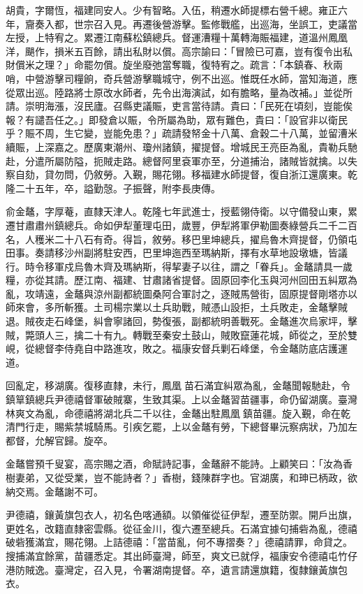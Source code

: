 \begin{pinyinscope}
胡貴，字爾恆，福建同安人。少有智略。入伍，稍遷水師提標右營千總。雍正六年，齎奏入都，世宗召入見。再遷後營游擊。監修戰艦，出巡海，坐誤工，吏議當左授，上特宥之。累遷江南蘇松鎮總兵。督運漕糧十萬轉海賑福建，道溫州鳳凰洋，颶作，損米五百餘，請出私財以償。高宗諭曰：「冒險已可嘉，豈有復令出私財償米之理？」命罷勿償。旋坐廢弛當奪職，復特宥之。疏言：「本鎮春、秋兩哨，中營游擊司糧餉，奇兵營游擊職城守，例不出巡。惟既任水師，當知海道，應從眾出巡。陸路將士原改水師者，先令出海演試，如有膽略，量為改補。」並從所請。崇明海漲，沒民廬。召縣吏議賑，吏言當待請。貴曰：「民死在頃刻，豈能俟報？有譴吾任之。」即發倉以賑，令所屬為助，眾有難色，貴曰：「設官非以衛民乎？賑不周，生它變，豈能免患？」疏請發帑金十八萬、倉穀二十八萬，並留漕米續賑，上深嘉之。歷廣東潮州、瓊州諸鎮，擢提督。增城民王亮臣為亂，貴勒兵馳赴，分遣所屬防隘，扼賊走路。總督阿里袞軍亦至，分道捕治，諸賊皆就擒。以失察自劾，貸勿問，仍敘勞。入覲，賜花翎。移福建水師提督，復自浙江還廣東。乾隆二十五年，卒，謚勤愨。子振聲，附李長庚傳。

俞金鼇，字厚菴，直隸天津人。乾隆七年武進士，授藍翎侍衛。以守備發山東，累遷甘肅肅州鎮總兵。命如伊犁董理屯田，歲豐，伊犁將軍伊勒圖奏綠營兵二千二百名，人穫米二十八石有奇。得旨，敘勞。移巴里坤總兵，擢烏魯木齊提督，仍領屯田事。奏請移沙州副將駐安西，巴里坤迤西至瑪納斯，擇有水草地設墩塘，皆議行。時令移軍戍烏魯木齊及瑪納斯，得挈妻子以往，謂之「眷兵」。金鼇請具一歲糧，亦從其請。歷江南、福建、甘肅諸省提督。固原回李化玉與河州回田五糾眾為亂，攻靖遠，金鼇與涼州副都統圖桑阿合軍討之，逐賊馬營街，固原提督剛塔亦以師來會，多所斬獲。土司楊宗業以土兵助戰，賊憑山設拒，土兵敗走，金鼇擊賊退。賊夜走石峰堡，糾會寧諸回，勢復張，副都統明善戰死。金鼇進次烏家坪，擊賊，斃頭人三，擒二十有九。轉戰至秦安土鼓山，賊敗竄蓮花城，師從之，至於雙峴，從總督李侍堯自中路進攻，敗之。福康安督兵剿石峰堡，令金鼇防底店護運道。

回亂定，移湖廣。復移直隸，未行，鳳凰苗石滿宜糾眾為亂，金鼇聞報馳赴，令鎮筸鎮總兵尹德禧督軍破賊寨，生致其渠。上以金鼇習苗疆事，命仍留湖廣。臺灣林爽文為亂，命德禧將湖北兵二千以往，金鼇出駐鳳凰鎮苗疆。旋入覲，命在乾清門行走，賜紫禁城騎馬。引疾乞罷，上以金鼇有勞，下總督畢沅察病狀，乃加左都督，允解官歸。旋卒。

金鼇嘗預千叟宴，高宗賜之酒，命賦詩記事，金鼇辭不能詩。上顧笑曰：「汝為香樹妻弟，又從受業，豈不能詩者？」香樹，錢陳群字也。官湖廣，和珅已柄政，欲納交焉。金鼇謝不可。

尹德禧，鑲黃旗包衣人，初名色喀通額。以領催從征伊犁，遷至防禦。開戶出旗，更姓名，改籍直隸密雲縣。從征金川，復六遷至總兵。石滿宜據句捕砦為亂，德禧破砦獲滿宜，賜花翎。上詰德禧：「當苗亂，何不專摺奏？」德禧請罪，命貸之。搜捕滿宜餘黨，苗疆悉定。其出師臺灣，師至，爽文已就俘，福康安令德禧屯竹仔港防賊逸。臺灣定，召入見，令署湖南提督。卒，遺言請還旗籍，復隸鑲黃旗包衣。


\end{pinyinscope}
